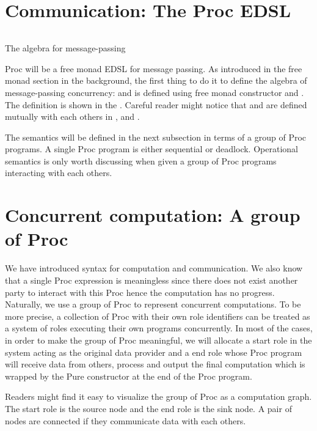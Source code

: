 \section{Communication: The Proc EDSL}
\begin{listing}[ht]
    \inputminted{Haskell}{spar/procf.hs}
    \caption{The algebra for message-passing}
    \label{spar:code:procf}
\end{listing}
Proc will be a free monad EDSL for message passing. As introduced in the free monad section in the background, the first thing to do it to define the algebra of message-passing concurrency:  and  is defined using free monad constructor and . The definition is shown in the . Careful reader might notice that  and  are defined mutually with each others in ,  and .

The semantics will be defined in the next subsection in terms of a group of Proc programs. A single Proc program is either sequential or deadlock. Operational semantics is only worth discussing when given a group of Proc programs interacting with each others.

\section{Concurrent computation: A group of Proc}
We have introduced syntax for computation and communication. We also know that a single Proc expression is meaningless since there does not exist another party to interact with this Proc hence the computation has no progress. Naturally, we use a group of Proc to represent concurrent computations. To be more precise, a collection of Proc with their own role identifiers can be treated as a system of roles executing their own programs concurrently. In most of the cases, in order to make the group of Proc meaningful, we will allocate a start role in the system acting as the original data provider and a end role whose Proc program will receive data from others, process and output the final computation which is wrapped by the Pure constructor at the end of the Proc program. 

Readers might find it easy to visualize the group of Proc as a computation graph. The start role is the source node and the end role is the sink node. A pair of nodes are connected if they communicate data with each others.
